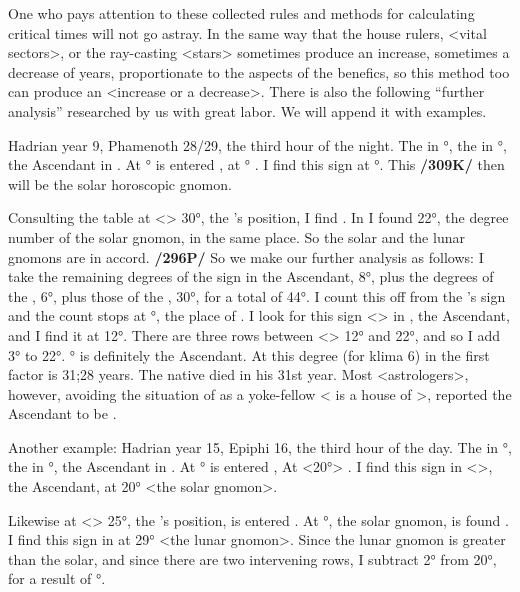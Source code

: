 One who pays attention to these collected rules and methods for calculating critical times will not go astray. In the same way that the house rulers, <vital sectors>, or the ray-casting <stars> sometimes produce an increase, sometimes a decrease of years, proportionate to the aspects of the benefics, so this method too
can produce an <increase or a decrease>. There is also the following “further analysis” researched by us with great labor. We will append it with examples.

Hadrian year 9, Phamenoth 28/29, the third hour of the night. The \Sun\xspace in \Aries\xspace 6°, the \Moon\xspace in \Aries\xspace
30°, the Ascendant in \Scorpio. At \Aries\xspace 6° is entered \Sagittarius, at \Sagittarius\xspace 6° \Cancer. I find this sign at \Scorpio\xspace 22°. This \textbf{/309K/} then will be the solar horoscopic gnomon. 

Consulting the table at <\Aries> 30°, the \Moon’s position, I find \Scorpio. In \Scorpio\xspace I found 22°, the degree number of the solar gnomon, in the same place. So the solar and the lunar gnomons are in accord. \textbf{/296P/} So we make our further analysis as follows: I take the remaining degrees of the sign in the Ascendant, 8°, plus the degrees of the \Sun, 6°, plus those of the \Moon, 30°, for a total of 44°. I count this off from the \Moon’s sign and the count
stops at \Taurus\xspace 14°, the place of \Gemini. I look for this sign <\Gemini> in \Scorpio, the Ascendant, and I find it at 12°. There are three rows between <\Scorpio> 12° and 22°, and so I add 3° to 22°. \Scorpio\xspace 25° is definitely the Ascendant. At this degree (for klima 6) in the first factor is 31;28 years. The native died
in his 31st year. Most <astrologers>, however, avoiding the situation of \Mars\xspace as a yoke-fellow <\Scorpio\xspace is a house of \Mars>, reported the Ascendant to be \Libra.

Another example: Hadrian year 15, Epiphi 16, the third hour of the day. The \Sun\xspace in °, the \Moon\xspace in \Gemini\xspace 25°, the Ascendant in \Virgo. At \Cancer\xspace 20° is entered \Virgo, At \Virgo <20°> \Cancer. I find this sign in <\Virgo>, the Ascendant, at 20° <the solar gnomon>.

Likewise at <\Gemini> 25°, the \Moon’s position, is entered \Aquarius. At \Aquarius\xspace 20°, the solar gnomon, is found \Aries. I find this sign in \Virgo\xspace at 29° <the lunar gnomon>. Since the lunar gnomon is greater than the solar, and since there are two intervening rows, I subtract 2° from 20°, for a result of \Virgo\xspace 18°. 

